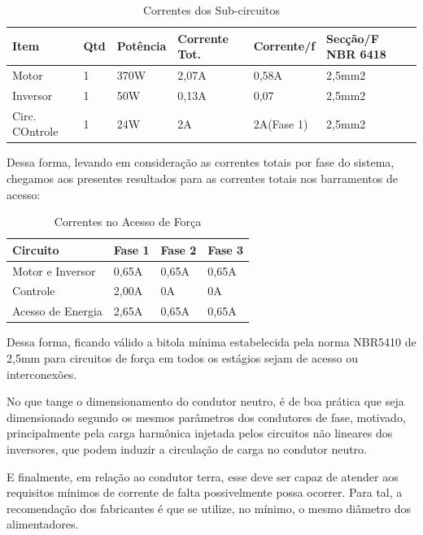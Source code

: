     \begin{table}[h]
  \centering
  \label{tab:correntes_sub_circuitos}

  \begin{tabular}{llllll}
    \toprule
    \textbf{Item} & \textbf{Qtd} &
        \textbf{Potência} & \textbf{Corrente Tot.}  & \textbf{Corrente/f}  &
        \textbf{Secção/F NBR 6418} \\
    \midrule
    Motor & 1 & 370W & 2,07A & 0,58A & 2,5mm2 \\
    Inversor & 1 & 50W & 0,13A & 0,07 & 2,5mm2 \\
    Circ. COntrole & 1 & 24W & 2A & 2A(Fase 1) & 2,5mm2 \\
    \bottomrule
  \end{tabular}

  \caption{Correntes dos Sub-circuitos}
\end{table}

Dessa forma, levando em consideração as correntes totais por fase do sistema, chegamos aos presentes 
resultados para as correntes totais nos barramentos de acesso:

    \begin{table}[h]
  \centering
  \label{tab:correntes_aco}

  \begin{tabular}{llll}
    \toprule
    \textbf{Circuito} & \textbf{Fase 1} & \textbf{Fase 2} & \textbf{Fase 3}\\
    \midrule
    Motor e Inversor & 0,65A & 0,65A & 0,65A \\
    Controle & 2,00A & 0A & 0A \\
        Acesso de Energia & 2,65A & 0,65A & 0,65A \\
    \bottomrule
  \end{tabular}

  \caption{Correntes no Acesso de Força}
\end{table}

Dessa forma, ficando válido a bitola mínima estabelecida pela norma NBR5410 de 2,5mm para circuitos de força em 
todos os estágios sejam de acesso ou interconexões. \cite{NBR5410}

No que tange o dimensionamento do condutor neutro, é de boa prática que seja dimensionado segundo os mesmos parâmetros
dos condutores de fase, motivado, principalmente pela carga harmônica injetada pelos circuitos não lineares dos inversores, 
que podem induzir a circulação de carga no condutor neutro.

    E finalmente, em relação ao condutor terra, esse deve ser capaz de atender aos requisitos mínimos de corrente de falta 
    possivelmente possa ocorrer. Para tal, a recomendação dos fabricantes é que se utilize, no mínimo, o mesmo diâmetro dos 
    alimentadores.

